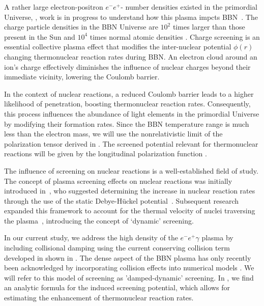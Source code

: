 A rather large electron-positron $e^-e^+$- number densities existed in the primordial Universe, , work is in progress to understand how this plasma impcts BBN~\cite{Wang:2010px,Hwang:2021kno,Rafelski:2023emw}. The charge particle densities in the BBN Universe are $10^2$ times larger than those present in the Sun \cite{Bahcall:2001smc} and $10^4$ times normal atomic densities \cite{Grayson:2023flr}. Charge screening is an essential collective plasma effect that modifies the inter-nuclear potential $\phi(r)$ changing thermonuclear reaction rates during BBN. An electron cloud around an ion's charge effectively diminishes the influence of nuclear charges beyond their immediate vicinity, lowering the Coulomb barrier. 

In the context of nuclear reactions, a reduced Coulomb barrier leads to a higher likelihood of penetration, boosting thermonuclear reaction rates. Consequently, this process influences the abundance of light elements in the primordial Universe by modifying their formation rates. Since the BBN temperature range is much less than the electron mass, we will use the nonrelativistic limit of the polarization tensor derived in . The screened potential relevant for thermonuclear reactions will be given by the longitudinal polarization function .

The influence of screening on nuclear reactions is a well-established field of study. The concept of plasma screening effects on nuclear reactions was initially introduced in~\cite{Salpeter:1954nc}, who suggested determining the increase in nuclear reaction rates through the use of the static Debye-H{\"u}ckel potential~\cite{Debye:1923,Salpeter:1969apj,Famiano:2016hhs}. Subsequent research expanded this framework to account for the thermal velocity of nuclei traversing the plasma~\cite{Hwang:2021kno,Carraro:1988apj,Gruzinov:1997as,Opher:1999jh,Yao:2016cjs}, introducing the concept of `dynamic' screening. 

In our current study, we address the high density of the $e^-e^+\gamma$ plasma by including collisional damping using the current conserving collision term developed in \cite{Formanek:2021blc} shown in . The dense aspect of the BBN plasma has only recently been acknowledged by incorporating collision effects into numerical models \cite{Sasankan:2019oee,Kedia:2020xdc}. We will refer to this model of screening as 'damped-dynamic' screening. In \cite{Grayson:2023flr}, we find an analytic formula for the induced screening potential, which allows for estimating the enhancement of thermonuclear reaction rates.

